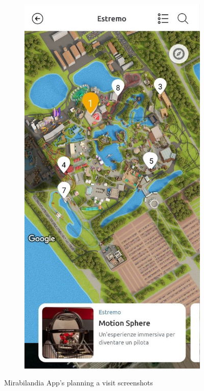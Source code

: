 \begin{figure}[H]
\begin{subfigure}[b]{0.35\textwidth}
	\end{subfigure}
	\begin{subfigure}[b]{0.35\textwidth}
		\centering
		\includegraphics[width=\textwidth]{img/miraextr}
	\end{subfigure}
	\caption{Mirabilandia App's planning a visit screenshots}
	\label{fig:miraApp}
\end{figure}

